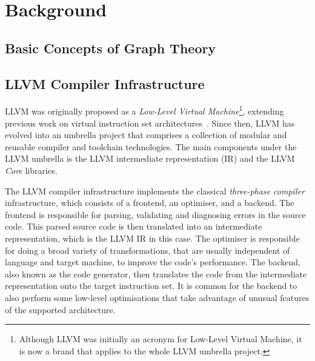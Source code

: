\chapter{Background}

\section{Basic Concepts of Graph Theory}

\section{LLVM Compiler Infrastructure}

LLVM was originally proposed as a \textit{Low-Level Virtual Machine}\footnote{Although LLVM was initially an acronym for Low-Level Virtual Machine, it is now a brand that applies to the whole LLVM umbrella project.}, extending previous work on virtual instruction set architectures~\citep{adve03,lattner04}.
Since then, LLVM has evolved into an umbrella project that comprises a collection of modular and reusable compiler and toolchain technologies.
The main components under the LLVM umbrella is the LLVM intermediate representation (IR) and the LLVM \textit{Core} libraries.

The LLVM compiler infrastructure implements the classical \textit{three-phase compiler} infrastructure, which consists of a frontend, an optimiser, and a backend.
The frontend is responsible for parsing, validating and diagnosing errors in the source code.
This parsed source code is then translated into an intermediate representation, which is the LLVM IR in this case.
The optimiser is responsible for doing a broad variety of transformations, that are usually independent of language and target machine, to improve the code's performance.
The backend, also known as the code generator, then translates the code from the intermediate representation onto the target instruction set.
It is common for the backend to also perform some low-level optimisations that take advantage of unusual features of the supported architecture.

